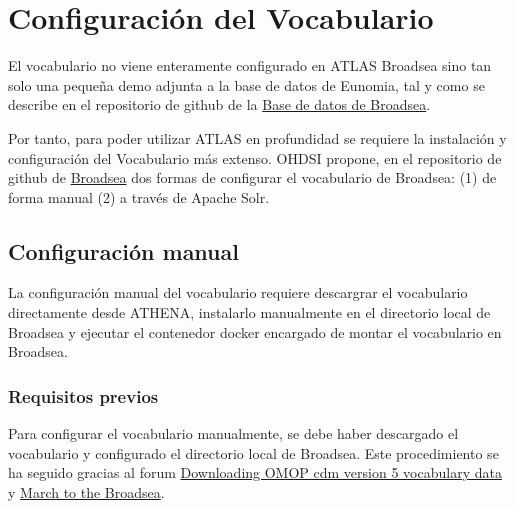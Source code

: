 \chapter{Configuración del Vocabulario}

El vocabulario no viene enteramente configurado en ATLAS Broadsea sino tan solo una pequeña demo adjunta a la base de datos de Eunomia, tal y como se describe en el repositorio de github de la \href{https://github.com/OHDSI/Broadsea-Atlasdb/tree/main}{ Base de datos de Broadsea}.

Por tanto, para poder utilizar ATLAS en profundidad se requiere la instalación y configuración del Vocabulario más extenso. OHDSI propone, en el repositorio de github de \href{https://github.com/OHDSI/Broadsea}{Broadsea} dos formas de configurar el vocabulario de Broadsea: (1) de forma manual (2) a través de Apache Solr. 

\section{Configuración manual}

La configuración manual del vocabulario requiere descargrar el vocabulario directamente desde ATHENA, instalarlo manualmente en el directorio local de Broadsea y ejecutar el contenedor docker encargado de montar el vocabulario en Broadsea. 


\subsection{Requisitos previos}

Para configurar el vocabulario manualmente,  se debe haber descargado el vocabulario y configurado el directorio local de Broadsea. Este procedimiento se ha seguido gracias al forum \href{https://forums.ohdsi.org/t/downloading-omop-cdm-version-5-vocabulary-data/3321/3}{Downloading OMOP cdm version 5 vocabulary data} y \href{https://forums.ohdsi.org/t/march-to-the-broadsea/20576}{March to the Broadsea}.

